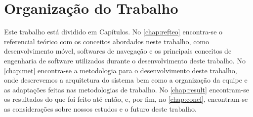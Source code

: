 \section{Organização do Trabalho}

Este trabalho está dividido em Capítulos. No \autoref{chap:refteo} encontra-se o referencial teórico com os conceitos abordados neste trabalho, como desenvolvimento móvel, softwares de navegação e os principais conceitos de engenharia de software utilizados durante o desenvolvimento deste trabalho. No \autoref{chap:met} encontra-se a metodologia para o desenvolvimento deste trabalho, onde descrevemos a arquitetura do sistema bem como a organização da equipe e as adaptações feitas nas metodologias de trabalho. No \autoref{chap:result} encontram-se os resultados do que foi feito até então, e, por fim, no \autoref{chap:concl}, encontram-se as considerações sobre nossos estudos e o futuro deste trabalho.
